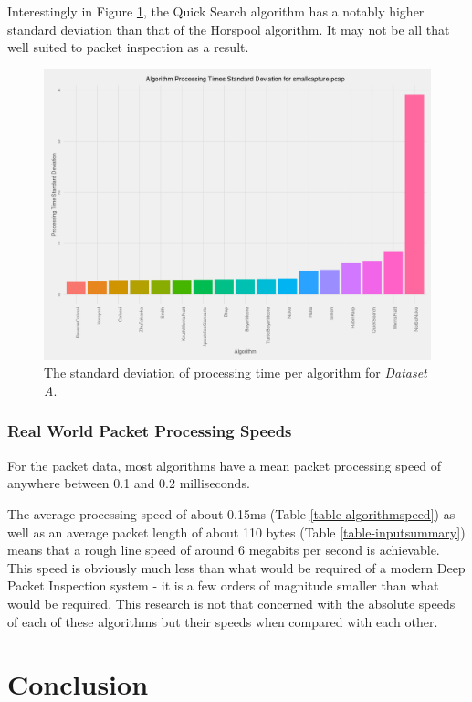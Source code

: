 \documentclass[9pt, conference]{IEEEtran}
\begin{document}
Interestingly in Figure \ref{figure-standarddeviation}, the Quick Search algorithm has a notably higher standard deviation than that of the Horspool algorithm. It may not be all that well suited to packet inspection as a result.

\begin{figure}[hbt]
  \includegraphics[width=\columnwidth]{images/bar_graph_algorithm_standard_deviation_pcap}
  \caption{The standard deviation of processing time per algorithm for \textit{Dataset A}.}
  \label{figure-standarddeviation}
\end{figure}


\subsubsection{Real World Packet Processing Speeds}

For the packet data, most algorithms have a mean packet processing speed of anywhere between 0.1 and 0.2 milliseconds.

The average processing speed of about 0.15ms (Table \ref{table-algorithmspeed}) as well as an average packet length of about 110 bytes (Table \ref{table-inputsummary}) means that a rough line speed of around 6 megabits per second is achievable. This speed is obviously much less than what would be required of a modern Deep Packet Inspection system - it is a few orders of magnitude smaller than what would be required. This research is not that concerned with the absolute speeds of each of these algorithms but their speeds when compared with each other. 

\section{Conclusion}
\end{document}
